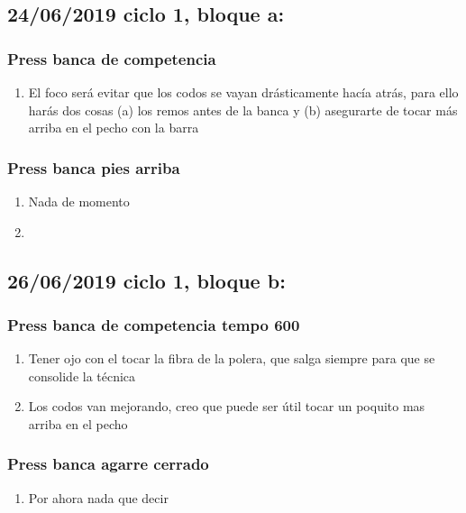 \documentclass[11pt]{article}
\begin{document}
\subsection{24/06/2019 ciclo 1, bloque a:}
\label{sec:org042cb5e}
\subsubsection{Press banca de competencia}
\label{sec:orgb449f80}
\begin{enumerate}
\item El foco será evitar que los codos se vayan drásticamente hacía
atrás, para ello harás dos cosas (a) los remos antes de la banca y
(b) asegurarte de tocar más arriba en el pecho con la barra
\end{enumerate}
\subsubsection{Press banca pies arriba}
\label{sec:org61f1e20}
\begin{enumerate}
\item Nada de momento
\item 
\end{enumerate}
\subsection{26/06/2019 ciclo 1, bloque b:}
\label{sec:org3507051}
\subsubsection{Press banca de competencia tempo 600}
\label{sec:orga07193f}
\begin{enumerate}
\item Tener ojo con el tocar la fibra de la polera, que salga siempre
para que se consolide la técnica
\item Los codos van mejorando, creo que puede ser útil tocar un poquito
mas arriba en el pecho
\end{enumerate}
\subsubsection{Press banca agarre cerrado}
\label{sec:orga944bb2}
\begin{enumerate}
\item Por ahora nada que decir
\end{enumerate}
\end{document}
